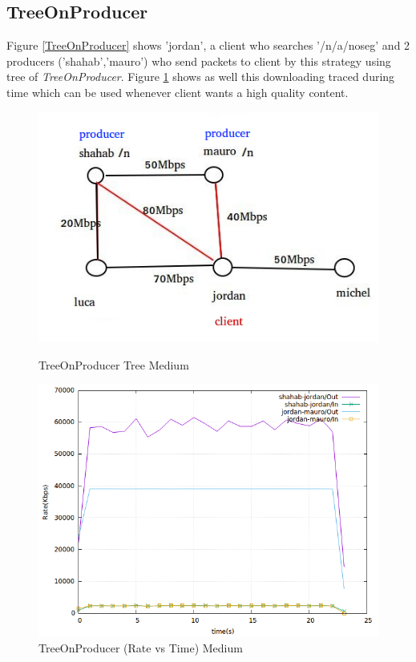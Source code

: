 \subsection{TreeOnProducer}
Figure \ref{TreeOnProducer} shows 'jordan', a client who searches '/n/a/noseg' and 2 producers ('shahab','mauro') who send packets to client by this strategy using tree of \textit{TreeOnProducer}. 
Figure \ref{treeonproducer} shows as well this downloading traced during time which can be used whenever client wants a high quality content.
\begin{figure}[H]

\begin{center}

\includegraphics[scale = 0.4]{Figures/TreeOnProducer.png}

\caption{TreeOnProducer Tree Medium} \label{TreeOnProducer} 


\includegraphics[scale = 0.4]{Figures/treeonproducer.png}

\caption{TreeOnProducer (Rate vs Time) Medium} \label{treeonproducer} 


\end{center}

\end{figure}

